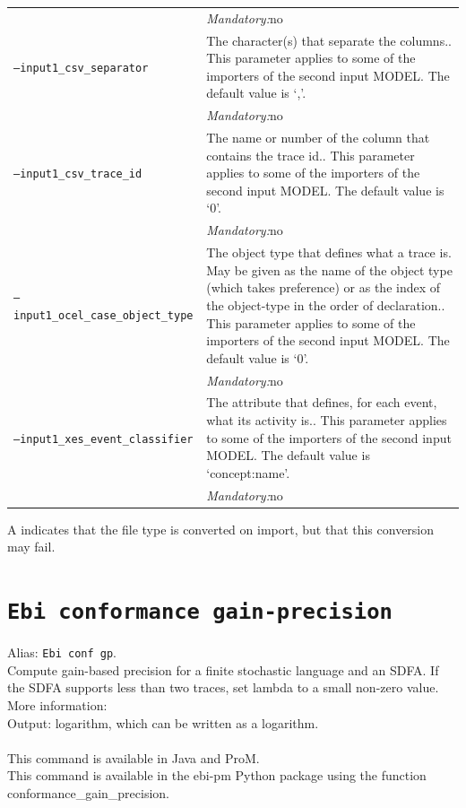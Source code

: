 {\begin{tabularx}{\linewidth}{lX}
&\textit{Mandatory:}\quad no\\
\texttt{--input1\_csv\_separator} & The character(s) that separate the columns.. This parameter applies to some of the importers of the second input MODEL. The default value is `,'.\\
&\textit{Mandatory:}\quad no\\
\texttt{--input1\_csv\_trace\_id} & The name or number of the column that contains the trace id.. This parameter applies to some of the importers of the second input MODEL. The default value is `0'.\\
&\textit{Mandatory:}\quad no\\
\texttt{--input1\_ocel\_case\_object\_type} & The object type that defines what a trace is. May be given as the name of the object type (which takes preference) or as the index of the object-type in the order of declaration.. This parameter applies to some of the importers of the second input MODEL. The default value is `0'.\\
&\textit{Mandatory:}\quad no\\
\texttt{--input1\_xes\_event\_classifier} & The attribute that defines, for each event, what its activity is.. This parameter applies to some of the importers of the second input MODEL. The default value is `concept:name'.\\
&\textit{Mandatory:}\quad no\\
\bottomrule
\end{tabularx}
A \textdagger{} indicates that the file type is converted on import, but that this conversion may fail.
\clearpage\section{\texttt{Ebi conformance gain-precision}}
\label{command:Ebi conformance gain-precision}
Alias: \texttt{Ebi conf gp}.\\
Compute gain-based precision for a finite stochastic language and an SDFA. If the SDFA supports less than two traces, set lambda to a small non-zero value.\\
More information: \cite{DBLP:journals/is/LeemansP23}~\\
\noindent Output: logarithm, which can be written as a logarithm.\\
\\This command is available in Java and ProM.
\\This command is available in the ebi-pm Python package using the function conformance\_gain\_precision.
\begin{tabularx}{\linewidth}{lX}

\end{tabularx}}
